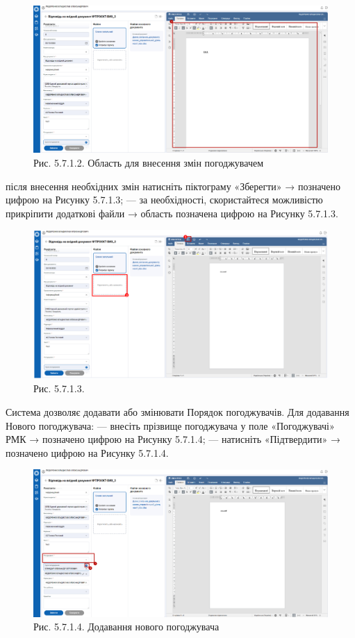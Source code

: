\begin{figure}[!htbp]
\centerline{\includegraphics[width=\textwidth]{img/5.7.1.2.png}}
\caption{Рис. 5.7.1.2. Область для внесення змін погоджувачем}
\end{figure}

після внесення необхідних змін натисніть піктограму «Зберегти» → позначено цифрою  на Рисунку 5.7.1.3;
--- за необхідності, скористайтеся можливістю прикріпити додаткові файли → область позначена цифрою  на Рисунку 5.7.1.3.

\begin{figure}[!htbp]
\centerline{\includegraphics[width=\textwidth]{img/5.7.1.3.png}}
\caption{Рис. 5.7.1.3. }
\end{figure}

Система дозволяє додавати або змінювати Порядок погоджувачів. Для додавання
Нового погоджувача:
--- внесіть прізвище погоджувача у поле «Погоджувачі» РМК → позначено цифрою  на Рисунку 5.7.1.4;
--- натисніть «Підтвердити» → позначено цифрою  на Рисунку 5.7.1.4.

\begin{figure}[!htbp]
\centerline{\includegraphics[width=\textwidth]{img/5.7.1.4.png}}
\caption{Рис. 5.7.1.4. Додавання нового погоджувача}
\end{figure}

